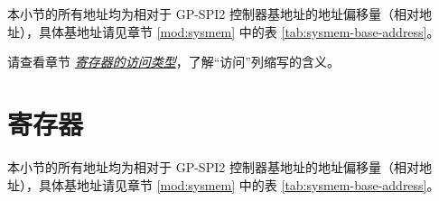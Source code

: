 \documentclass[main\_\_CN.tex]{subfiles}
\begin{document}
本小节的所有地址均为相对于 GP-SPI2 控制器基地址的地址偏移量（相对地址），具体基地址请见章节 \ref{mod:sysmem} \textit{} 中的表 \ref{tab:sysmem-base-address}。

请查看章节 \hyperref[glossary-access-types]{\textit{寄存器的访问类型}}，了解“访问”列缩写的含义。





\clearpage
\section{寄存器}
\label{sec:spi-reg}

本小节的所有地址均为相对于 GP-SPI2 控制器基地址的地址偏移量（相对地址），具体基地址请见章节 \ref{mod:sysmem} \textit{} 中的表 \ref{tab:sysmem-base-address}。


\end{document}
